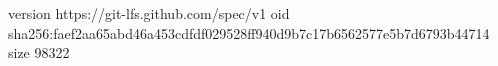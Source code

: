 version https://git-lfs.github.com/spec/v1
oid sha256:faef2aa65abd46a453cdfdf029528ff940d9b7c17b6562577e5b7d6793b44714
size 98322
